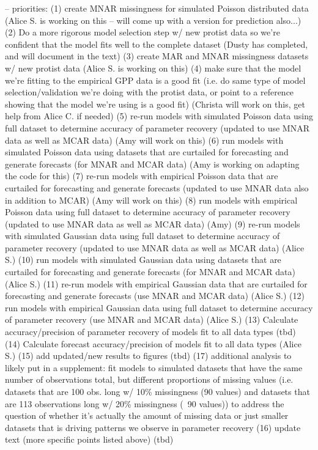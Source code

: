 \documentclass{article}
\begin{document}
-- priorities: 
(1) create MNAR missingness for simulated Poisson distributed data (Alice S. is working on this -- will come up with a version for prediction also...) 
(2) Do a more rigorous model selection step w/ new protist data so we're confident that the model fits well to the complete dataset (Dusty has completed, and will document in the text)
(3) create MAR and MNAR missingness datasets w/ new protist data (Alice S. is working on this)
(4) make sure that the model we're fitting to the empirical GPP data is a good fit (i.e. do same type of model selection/validation we're doing with the protist data, or point to a reference showing that the model we're using is a good fit)  (Christa will work on this, get help from Alice C. if needed)
(5) re-run models with simulated Poisson data using full dataset to determine accuracy of parameter recovery  (updated to use MNAR data as well as MCAR data)   (Amy will work on this)
(6) run models with simulated Poisson data using datasets that are curtailed for forecasting and generate forecasts (for MNAR and MCAR data) (Amy is working on adapting the code for this)
(7) re-run models with empirical Poisson data that are curtailed for forecasting and generate forecasts (updated to use MNAR data also in addition to MCAR) (Amy will work on this) 
(8) run models with empirical Poisson data using full dataset to determine accuracy of parameter recovery  (updated to use MNAR data as well as MCAR data) (Amy)
(9) re-run models with simulated Gaussian data using full dataset to determine accuracy of parameter recovery  (updated to use MNAR data as well as MCAR data) (Alice S.)
(10) run models with simulated Gaussian data using datasets that are curtailed for forecasting and generate forecasts (for MNAR and MCAR data)  (Alice S.)
(11) re-run models with empirical Gaussian data that are curtailed for forecasting and generate forecasts (use MNAR and MCAR data) (Alice S.)
(12) run models with empirical Gaussian data using full dataset to determine accuracy of parameter recovery (use MNAR and MCAR data)  (Alice S.)
(13) Calculate accuracy/precision of parameter recovery of models fit to all data types (tbd)
(14) Calculate forecast accuracy/precision of models fit to all data types (Alice S.)
(15) add updated/new results to figures (tbd)
(17) additional analysis to likely put in a supplement: fit models to simulated datasets that have the same number of observations total, but different proportions of missing values (i.e. datasets that are 100 obs. long w/ 10\% missingness (90 values) and datasets that are 113 observations long w/ 20\% missingness (~90 values)) to address the question of whether it's actually the amount of missing data or just smaller datasets that is driving patterns we observe in parameter recovery
(16) update text (more specific points listed above) (tbd)
\end{document}
